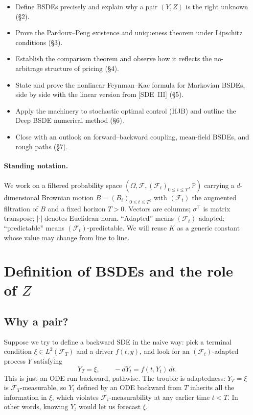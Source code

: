 \documentclass{article}
\newcommand{\Prob}{\mathbb{P}}
\newcommand{\F}{\mathcal{F}}
\begin{document}
\begin{itemize}
  \item Define BSDEs precisely and explain why a pair $(Y, Z)$ is the right unknown (\S2).
  \item Prove the Pardoux--Peng existence and uniqueness theorem under Lipschitz conditions (\S3).
  \item Establish the comparison theorem and observe how it reflects the no-arbitrage structure of pricing (\S4).
  \item State and prove the nonlinear Feynman--Kac formula for Markovian BSDEs, side by side with the linear version from [SDE~III] (\S5).
  \item Apply the machinery to stochastic optimal control (HJB) and outline the Deep BSDE numerical method (\S6).
  \item Close with an outlook on forward--backward coupling, mean-field BSDEs, and rough paths (\S7).
\end{itemize}

\paragraph{Standing notation.} We work on a filtered probability space $(\Omega, \F, (\F_t)_{0 \le t \le T}, \Prob)$ carrying a $d$-dimensional Brownian motion $B = (B_t)_{0 \le t \le T}$, with $(\F_t)$ the augmented filtration of $B$ and a fixed horizon $T > 0$. Vectors are columns; $\sigma^{\top}$ is matrix transpose; $|\cdot|$ denotes Euclidean norm. ``Adapted'' means $(\F_t)$-adapted; ``predictable'' means $(\F_t)$-predictable. We will reuse $K$ as a generic constant whose value may change from line to line.

\section{Definition of BSDEs and the role of \texorpdfstring{$Z$}{Z}}

\subsection{Why a pair?}

Suppose we try to define a backward SDE in the naive way: pick a terminal condition $\xi \in L^2(\F_T)$ and a driver $f(t, y)$, and look for an $(\F_t)$-adapted process $Y$ satisfying
\[
  Y_T = \xi, \qquad -dY_t = f(t, Y_t)\,dt.
\]
This is just an ODE run backward, pathwise. The trouble is adaptedness: $Y_T = \xi$ is $\F_T$-measurable, so $Y_t$ defined by an ODE backward from $T$ inherits all the information in $\xi$, which violates $\F_t$-measurability at any earlier time $t < T$. In other words, knowing $Y_t$ would let us forecast $\xi$.
\end{document}
